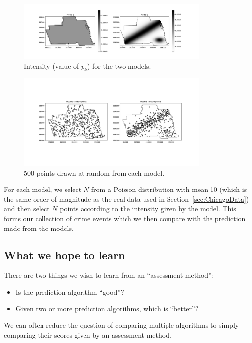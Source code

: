 \documentclass[twoside,a4paper,twocolumn,10pt]{article}
\theoremstyle{plain}
\theoremstyle{definition}
\begin{document}
\begin{figure}
    \centering
    \includegraphics[width=3.7in]{../details/model_intensity.pdf}
    \caption{\textsf{Intensity (value of $p_k$) for the two models.}}
    \label{fig:2}
\end{figure}

\begin{figure}
    \centering
    \includegraphics[width=3.7in]{../details/model_example_points.pdf}
    \caption{\textsf{500 points drawn at random from each model.}}
    \label{fig:3}
\end{figure}

For each model, we select $N$ from a Poisson distribution with mean 10 (which is the same
order of magnitude as the real data used in Section~\ref{sec:ChicagoData})
and then select $N$ points according to the intensity given by the model.  This forms our
collection of crime events which we then compare with the prediction made from the models.



\subsection{What we hope to learn}

There are two things we wish to learn from an ``assessment method'':
\begin{itemize}
\item Is the prediction algorithm ``good''?
\item Given two or more prediction algorithms, which is ``better''?
\end{itemize}
We can often reduce the question of comparing multiple algorithms to simply
comparing their scores given by an assessment method.
\end{document}

